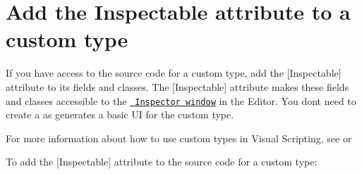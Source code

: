 \chapter{Add the Inspectable attribute to a custom type}
\hypertarget{md__hey_tea_9_2_library_2_package_cache_2com_8unity_8visualscripting_0d1_88_80_2_documentation_02c7eb7fa04d5782bd90a1af21b9dcfff}{}\label{md__hey_tea_9_2_library_2_package_cache_2com_8unity_8visualscripting_0d1_88_80_2_documentation_02c7eb7fa04d5782bd90a1af21b9dcfff}
\label{md__hey_tea_9_2_library_2_package_cache_2com_8unity_8visualscripting_0d1_88_80_2_documentation_02c7eb7fa04d5782bd90a1af21b9dcfff_autotoc_md5145}%
%
 If you have access to the source code for a custom type, add the {\ttfamily \mbox{[}Inspectable\mbox{]}} attribute to its fields and classes. The {\ttfamily \mbox{[}Inspectable\mbox{]}} attribute makes these fields and classes accessible to the \href{https://docs.unity3d.com/Manual/UsingTheInspector.html}{\texttt{ Inspector window}} in the  Editor. You don\textquotesingle{}t need to create a  as  generates a basic UI for the custom type.

For more information about how to use custom types in Visual Scripting, see  or 

To add the {\ttfamily \mbox{[}Inspectable\mbox{]}} attribute to the source code for a custom type\+:



